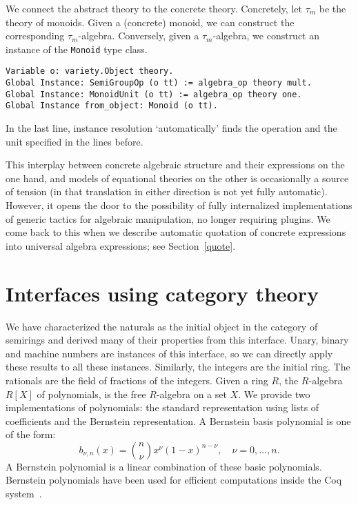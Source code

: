 \documentclass[a4paper,10pt,runningheads]{llncs}
\begin{document}
We connect the abstract theory to the concrete theory. Concretely, let $\tau_m$ be the theory
of monoids. Given a (concrete) monoid, we can construct the corresponding $\tau_m$-algebra. 
Conversely, given a $\tau_m$-algebra, we construct an instance of the \lstinline|Monoid| type class.
\begin{lstlisting}
Variable o: variety.Object theory.
Global Instance: SemiGroupOp (o tt) := algebra_op theory mult.
Global Instance: MonoidUnit (o tt) := algebra_op theory one.
Global Instance from_object: Monoid (o tt).
\end{lstlisting}

In the last line, instance resolution `automatically' finds the operation and the unit specified in
the lines before.

This interplay between concrete algebraic structure and their expressions on the one hand, and models of equational theories on the other is occasionally a source of tension (in that translation in either direction is not yet fully automatic). However, it opens the door to the possibility of fully internalized implementations of generic tactics for algebraic manipulation, no longer requiring plugins. We come back to this when we describe automatic quotation of concrete expressions into universal algebra expressions; see Section~\ref{quote}.


\section{Interfaces using category theory}\label{interfaces}\label{modul}
We have characterized the naturals as the initial object in the category of semirings and derived
many of their properties from this interface. Unary, binary and machine numbers are
instances of this interface, so we can directly apply these results to all these instances.
Similarly, the integers are the initial ring. The rationals are the field of fractions of the
integers. 
Given a ring $R$, the $R$-algebra $R[X]$ of polynomials, is the free $R$-algebra on a set $X$.
We provide two implementations of polynomials: the
standard representation using lists of coefficients and the Bernstein representation. A Bernstein
basis polynomial is one of the form:
\[b_{\nu,n}(x) = {n \choose \nu} x^{\nu} \left( 1 - x \right)^{n - \nu}, \quad \nu = 0, \ldots, n.\]
A Bernstein polynomial is a linear combination of these basic polynomials. Bernstein polynomials
have been used for efficient computations inside the Coq system~\cite{ZumkellerPhD}.
\end{document}
